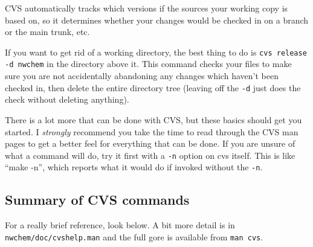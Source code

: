 CVS automatically tracks which versions if the sources your working
copy is based on, so it determines whether your changes would be
checked in on a branch or the main trunk, etc.

If you want to get rid of a working directory, the best thing to do is
{\tt cvs release -d nwchem} in the directory above it.  This command
checks your files to make sure you are not accidentally abandoning any
changes which haven't been checked in, then delete the entire
directory tree (leaving off the {\tt -d} just does the check without
deleting anything).

There is a lot more that can be done with CVS, but these basics should
get you started.  I {\em strongly} recommend you take the time to read
through the CVS man pages to get a better feel for everything that can
be done.  If you are unsure of what a command will do, try it first
with a {\tt -n} option on cvs itself.  This is like ``make -n'', which
reports what it would do if invoked without the {\tt -n}.

\subsection{Summary of CVS commands}

For a really brief reference, look below.  A bit more detail is in
\verb+nwchem/doc/cvshelp.man+ and the full gore is available from
\verb+man cvs+.

